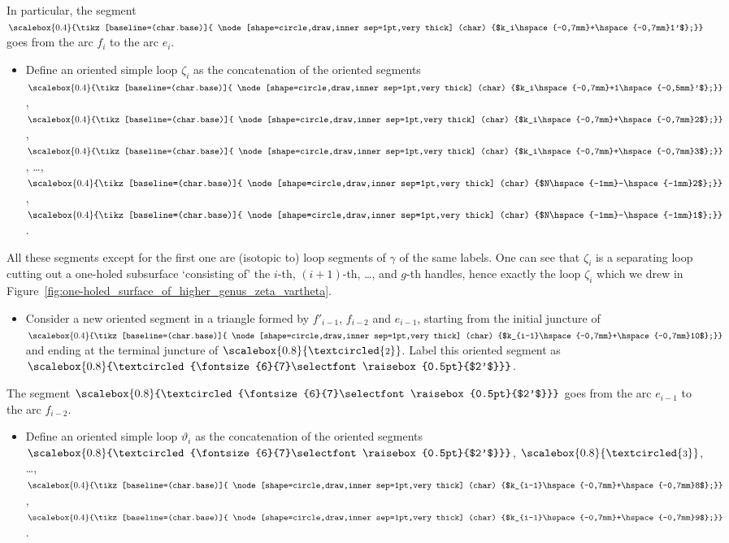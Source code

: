 \documentclass[10pt,a4paper]{amsart}
\numberwithin{equation}{section}
\theoremstyle{definition}
\newcommand{\circled}[1]{\scalebox{0.8}{\textcircled{\fontsize{8}{9}\selectfont \raisebox{-0.1pt}{#1}}}}
\newcommand{\circledd}[1]{\scalebox{0.8}{\textcircled{\fontsize{6}{7}\selectfont \raisebox{0.5pt}{#1}}}}
\newcommand*\circleddd[1]{\scalebox{0.4}{\tikz[baseline=(char.base)]{
 \node[shape=circle,draw,inner sep=1pt,very thick] (char) {#1};}}}
\begin{document}
In particular, the segment $\circleddd{$k_i\hspace{-0,7mm}+\hspace{-0,7mm}1'$}$ goes from the arc $f_i$ to the arc $e_i$.
\begin{itemize}\itemsep=0pt
\item Define an oriented simple loop $\zeta_i$ as the concatenation of the oriented segments $\circleddd{$k_i\hspace{-0,7mm}+1\hspace{-0,5mm}'$}$, $\circleddd{$k_i\hspace{-0,7mm}+\hspace{-0,7mm}2$}$, $\circleddd{$k_i\hspace{-0,7mm}+\hspace{-0,7mm}3$}$, \dots, $\circleddd{$N\hspace{-1mm}-\hspace{-1mm}2$}$, $\circleddd{$N\hspace{-1mm}-\hspace{-1mm}1$}$.
\end{itemize}
All these segments except for the first one are (isotopic to) loop segments of $\gamma$ of the same labels. One can see that $\zeta_i$ is a separating loop cutting out a one-holed subsurface `consisting of' the $i$-th, $(i+1)$-th, \dots, and $g$-th handles, hence exactly the loop $\zeta_i$ which we drew in Figure~\ref{fig:one-holed_surface_of_higher_genus_zeta_vartheta}.
\begin{itemize}\itemsep=0pt
\item Consider a new oriented segment in a triangle formed by $f'_{i-1}$, $f_{i-2}$ and $e_{i-1}$, starting from the initial juncture of $\circleddd{$k_{i-1}\hspace{-0,7mm}+\hspace{-0,7mm}10$}$ and ending at the terminal juncture of $\circled{2}$. Label this oriented segment as $\circledd{$2'$}$.
\end{itemize}
The segment $\circledd{$2'$}$ goes from the arc $e_{i-1}$ to the arc $f_{i-2}$.
\begin{itemize}\itemsep=0pt
\item Define an oriented simple loop $\vartheta_i$ as the concatenation of the oriented segments $\circledd{$2'$}$, $\circled{3}$, \dots, $\circleddd{$k_{i-1}\hspace{-0,7mm}+\hspace{-0,7mm}8$}$, $\circleddd{$k_{i-1}\hspace{-0,7mm}+\hspace{-0,7mm}9$}$.
\end{itemize}
\end{document}
